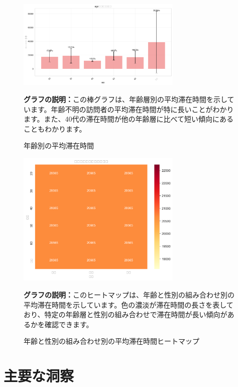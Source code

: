 \documentclass[11pt,a4paper]{article}
\begin{document}
\begin{figure}[H]
    \centering
    \includegraphics[width=0.7\textwidth]{images/age_bar_chart.png}
    \caption{年齢別の平均滞在時間}
    \label{fig:age}
    \textbf{グラフの説明：}この棒グラフは、年齢層別の平均滞在時間を示しています。年齢不明の訪問者の平均滞在時間が特に長いことがわかります。また、40代の滞在時間が他の年齢層に比べて短い傾向にあることもわかります。
\end{figure}

\begin{figure}[H]
    \centering
    \includegraphics[width=0.7\textwidth]{images/age_gender_heatmap.png}
    \caption{年齢と性別の組み合わせ別の平均滞在時間ヒートマップ}
    \label{fig:age_gender}
    \textbf{グラフの説明：}このヒートマップは、年齢と性別の組み合わせ別の平均滞在時間を示しています。色の濃淡が滞在時間の長さを表しており、特定の年齢層と性別の組み合わせで滞在時間が長い傾向があるかを確認できます。
\end{figure}

\section{主要な洞察}
\end{document}
